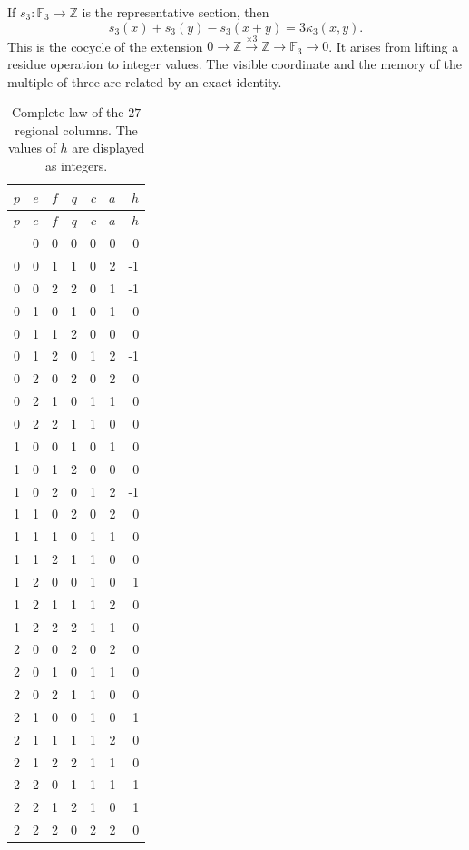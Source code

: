 If \(s_3:\mathbb F_3\to\mathbb Z\) is the representative
section, then
\[
s_3(x)+s_3(y)-s_3(x+y)=3\kappa_3(x,y).
\]
This is the cocycle of the extension
\(0\to\mathbb Z\xrightarrow{\times3}\mathbb Z\to\mathbb F_3\to0\).
It arises from lifting a residue operation to integer
values. The visible coordinate and the memory of the
multiple of three are related by an exact identity.

\begin{longtable}{ccc|rrrr}
\caption{Complete law of the \(27\) regional columns.
The values of \(h\) are displayed as integers.}
\label{carry27:tabla}\\
\toprule
\(p\)&\(e\)&\(f\)&\(q\)&\(c\)&\(a\)&\(h\)\\
\midrule\endfirsthead
\toprule
\(p\)&\(e\)&\(f\)&\(q\)&\(c\)&\(a\)&\(h\)\\
\midrule\endhead
\bottomrule\endfoot
0&0&0&0&0&0&0\\
0&0&1&1&0&2&-1\\
0&0&2&2&0&1&-1\\
0&1&0&1&0&1&0\\
0&1&1&2&0&0&0\\
0&1&2&0&1&2&-1\\
0&2&0&2&0&2&0\\
0&2&1&0&1&1&0\\
0&2&2&1&1&0&0\\
1&0&0&1&0&1&0\\
1&0&1&2&0&0&0\\
1&0&2&0&1&2&-1\\
1&1&0&2&0&2&0\\
1&1&1&0&1&1&0\\
1&1&2&1&1&0&0\\
1&2&0&0&1&0&1\\
1&2&1&1&1&2&0\\
1&2&2&2&1&1&0\\
2&0&0&2&0&2&0\\
2&0&1&0&1&1&0\\
2&0&2&1&1&0&0\\
2&1&0&0&1&0&1\\
2&1&1&1&1&2&0\\
2&1&2&2&1&1&0\\
2&2&0&1&1&1&1\\
2&2&1&2&1&0&1\\
2&2&2&0&2&2&0\\
\end{longtable}

